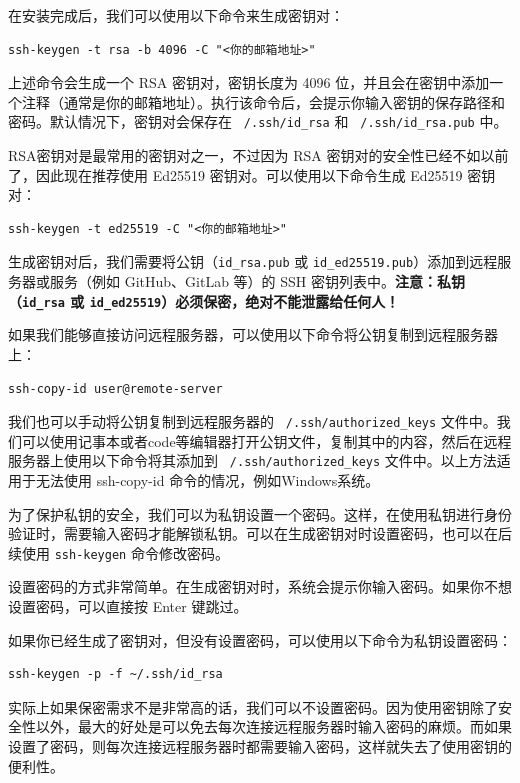 \documentclass[../main.tex]{subfiles}
\begin{document}
在安装完成后，我们可以使用以下命令来生成密钥对：
\begin{verbatim}
ssh-keygen -t rsa -b 4096 -C "<你的邮箱地址>"
\end{verbatim}

上述命令会生成一个 RSA 密钥对，密钥长度为 4096 位，并且会在密钥中添加一个注释（通常是你的邮箱地址）。执行该命令后，会提示你输入密钥的保存路径和密码。默认情况下，密钥对会保存在 \texttt{~/.ssh/id\_rsa} 和 \texttt{~/.ssh/id\_rsa.pub} 中。

RSA密钥对是最常用的密钥对之一，不过因为 RSA 密钥对的安全性已经不如以前了，因此现在推荐使用 Ed25519 密钥对。可以使用以下命令生成 Ed25519 密钥对：
\begin{verbatim}
ssh-keygen -t ed25519 -C "<你的邮箱地址>"
\end{verbatim}

生成密钥对后，我们需要将公钥（\texttt{id\_rsa.pub} 或 \texttt{id\_ed25519.pub}）添加到远程服务器或服务（例如 GitHub、GitLab 等）的 SSH 密钥列表中。\textbf{注意：私钥（\texttt{id\_rsa} 或 \texttt{id\_ed25519}）必须保密，绝对不能泄露给任何人！}

如果我们能够直接访问远程服务器，可以使用以下命令将公钥复制到远程服务器上：
\begin{verbatim}
ssh-copy-id user@remote-server
\end{verbatim}

我们也可以手动将公钥复制到远程服务器的 \texttt{~/.ssh/authorized\_keys} 文件中。我们可以使用记事本或者code等编辑器打开公钥文件，复制其中的内容，然后在远程服务器上使用以下命令将其添加到 \texttt{~/.ssh/authorized\_keys} 文件中。以上方法适用于无法使用 ssh-copy-id 命令的情况，例如Windows系统。

为了保护私钥的安全，我们可以为私钥设置一个密码。这样，在使用私钥进行身份验证时，需要输入密码才能解锁私钥。可以在生成密钥对时设置密码，也可以在后续使用 \texttt{ssh-keygen} 命令修改密码。

设置密码的方式非常简单。在生成密钥对时，系统会提示你输入密码。如果你不想设置密码，可以直接按 Enter 键跳过。

如果你已经生成了密钥对，但没有设置密码，可以使用以下命令为私钥设置密码：
\begin{verbatim}
ssh-keygen -p -f ~/.ssh/id_rsa
\end{verbatim}

实际上如果保密需求不是非常高的话，我们可以不设置密码。因为使用密钥除了安全性以外，最大的好处是可以免去每次连接远程服务器时输入密码的麻烦。而如果设置了密码，则每次连接远程服务器时都需要输入密码，这样就失去了使用密钥的便利性。
\end{document}
